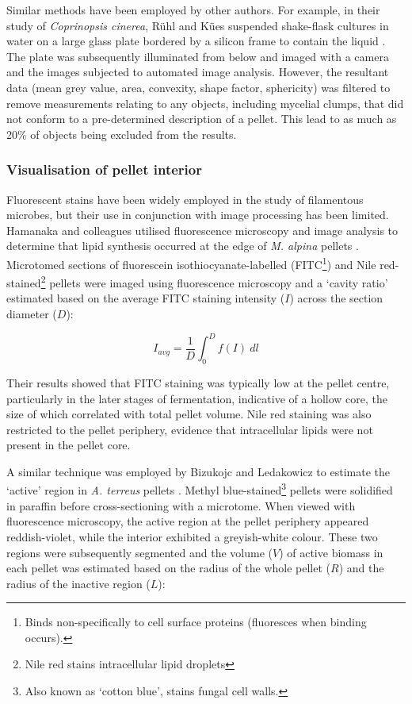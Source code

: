Similar methods have been employed by other authors. For example, in their study of \emph{Coprinopsis cinerea}, R\"{u}hl and K\"{u}es suspended shake-flask cultures in water on a large glass plate bordered by a silicon frame to contain the liquid \cite{ruhl2009}. The plate was subsequently illuminated from below and imaged with a camera and the images subjected to automated image analysis. However, the resultant data (mean grey value, area, convexity, shape factor, sphericity) was filtered to remove measurements relating to any objects, including mycelial clumps, that did not conform to a pre-determined description of a pellet. This lead to as much as 20\% of objects being excluded from the results.

\subsubsection{Visualisation of pellet interior}

Fluorescent stains have been widely employed in the study of filamentous microbes, but their use in conjunction with image processing has been limited. Hamanaka and colleagues utilised fluorescence microscopy and image analysis to determine that lipid synthesis occurred at the edge of \emph{M. alpina} pellets \cite{hamanaka2001}. Microtomed sections of fluorescein isothiocyanate-labelled (FITC\footnote{Binds non-specifically to cell surface proteins (fluoresces when binding occurs).}) and Nile red-stained\footnote{Nile red stains intracellular lipid droplets} pellets were imaged using fluorescence microscopy and a \lq cavity ratio' estimated based on the average FITC staining intensity ($I$) across the section diameter ($D$):

\begin{equation}
	I_{avg} = \frac{1}{D} \int_0^D \! f(I) \ dl
\end{equation}

\noindent Their results showed that FITC staining was typically low at the pellet centre, particularly in the later stages of fermentation, indicative of a hollow core, the size of which correlated with total pellet volume. Nile red staining was also restricted to the pellet periphery, evidence that intracellular lipids were not present in the pellet core.

A similar technique was employed by Bizukojc and Ledakowicz to estimate the \lq active' region in \emph{A. terreus} pellets \cite{bizukojc2009}. Methyl blue-stained\footnote{Also known as \lq cotton blue', stains fungal cell walls.} pellets were solidified in paraffin before cross-sectioning with a microtome. When viewed with fluorescence microscopy, the active region at the pellet periphery appeared reddish-violet, while the interior exhibited a greyish-white colour. These two regions were subsequently segmented and the volume ($V$) of active biomass in each pellet was estimated based on the radius of the whole pellet ($R$) and the radius of the inactive region ($L$):

